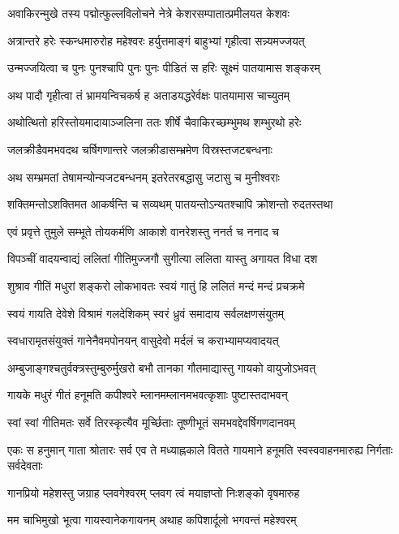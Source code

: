 \twolineshloka
{अवाकिरन्मुखे तस्य पद्मोत्फुल्लविलोचने}
{नेत्रे केशरसम्पातात्प्रमीलयत केशवः}%

\twolineshloka
{अत्रान्तरे हरेः स्कन्धमारुरोह महेश्वरः}
{हर्युत्तमाङ्गं बाहुभ्यां गृहीत्वा सन्न्यमज्जयत्}%

\twolineshloka
{उन्मज्जयित्वा च पुनः पुनश्चापि पुनः पुनः}
{पीडितं स हरिः सूक्ष्मं पातयामास शङ्करम्}%

\twolineshloka
{अथ पादौ गृहीत्वा तं भ्रामयन्विचकर्ष ह}
{अताडयद्धरेर्वक्षः पातयामास चाच्युतम्}%

\twolineshloka
{अथोत्थितो हरिस्तोयमादायाञ्जलिना ततः}
{शीर्षे चैवाकिरच्छम्भुमथ शम्भुरथो हरेः}%

\twolineshloka
{जलक्रीडैवमभवदथ चर्षिगणान्तरे}
{जलक्रीडासम्भ्रमेण विस्रस्तजटबन्धनाः}%

\twolineshloka
{अथ सम्भ्रमतां तेषामन्योन्यजटबन्धनम्}
{इतरेतरबद्धासु जटासु च मुनीश्वराः}%

\twolineshloka
{शक्तिमन्तोऽशक्तिमत आकर्षन्ति च सव्यथम्}
{पातयन्तोऽन्यतश्चापि क्रोशन्तो रुदतस्तथा}%

\twolineshloka
{एवं प्रवृत्ते तुमुले सम्भूते तोयकर्मणि}
{आकाशे वानरेशस्तु ननर्त च ननाद च}%

\twolineshloka
{विपञ्चीं वादयन्वाद्यं ललितां गीतिमुज्जगौ}
{सुगीत्या ललिता यास्तु अगायत विधा दश}%

\twolineshloka
{शुश्राव गीतिं मधुरां शङ्करो लोकभावतः}
{स्वयं गातुं हि ललितं मन्दं मन्दं प्रचक्रमे}%

\twolineshloka
{स्वयं गायति देवेशे विश्रामं गलदेशिकम्}
{स्वरं ध्रुवं समादाय सर्वलक्षणसंयुतम्}%

\twolineshloka
{स्वधारामृतसंयुक्तं गानेनैवमपोनयन्}
{वासुदेवो मर्दलं च कराभ्यामप्यवादयत्}%

\twolineshloka
{अम्बुजाङ्गश्चतुर्वक्त्रस्तुम्बुरुर्मुखरो बभौ}
{तानका गौतमाद्यास्तु गायको वायुजोऽभवत्}%

\twolineshloka
{गायके मधुरं गीतं हनूमति कपीश्वरे}
{म्लानमम्लानमभवत्कृशाः पुष्टास्तदाभवन्}%

\twolineshloka
{स्वां स्वां गीतिमतः सर्वे तिरस्कृत्यैव मूर्च्छिताः}
{तूष्णीभूतं समभवद्देवर्षिगणदानवम्}%

\threelineshloka
{एकः स हनुमान् गाता श्रोतारः सर्व एव ते}
{मध्याह्नकाले वितते गायमाने हनूमति}
{स्वस्ववाहनमारुह्य निर्गताः सर्वदेवताः}%

\twolineshloka
{गानप्रियो महेशस्तु जग्राह प्लवगेश्वरम्}
{प्लवग त्वं मयाज्ञप्तो निःशङ्को वृषमारुह}%

\twolineshloka
{मम चाभिमुखो भूत्वा गायस्वानेकगायनम्}
{अथाह कपिशार्दूलो भगवन्तं महेश्वरम्}%

